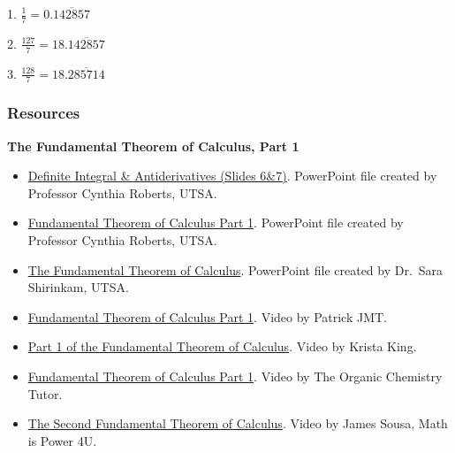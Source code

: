 1.  $\frac17=0.\overline{142857}$

2.  $\frac{127}{7}=18.\overline{142857}$

3.  $\frac{128}{7}=18.\overline{285714}$


\subsubsection{Resources}
\label{sss:reso-55b5}

\textbf{The Fundamental Theorem of Calculus, Part 1}

\begin{itemize}

\item \href{https://mathresearch.utsa.edu/wikiFiles/MAT1193/The\%20Fundamental\%20Theorem\%20of\%20Calculus/Presentation12_DefiniteIntegral\%20\&\%20Antiderivatives.pptx}{Definite Integral \& Antiderivatives (Slides 6\&7)}.  
PowerPoint file created by Professor Cynthia Roberts, UTSA.

\item \href{https://mathresearch.utsa.edu/wikiFiles/MAT1193/The\%20Fundamental\%20Theorem\%20of\%20Calculus/Presentation13_FTC\%20Part\%20I.pptx}{Fundamental Theorem of Calculus Part 1}.  
PowerPoint file created by Professor Cynthia Roberts, UTSA.

\item \href{https://mathresearch.utsa.edu/wikiFiles/MAT1214/The\%20Fundamental\%20Theorem\%20of\%20Calculus_/MAT1214-TheFundamentalTheoremPwPt.pptx}{The Fundamental Theorem of Calculus}.  
PowerPoint file created by Dr.\ Sara Shirinkam, UTSA.

\item \href{https://youtu.be/PGmVvIglZx8}{Fundamental Theorem of Calculus Part 1}.  
Video by Patrick JMT.

\item \href{https://youtu.be/yrQ6PnE6D8w}{Part 1 of the Fundamental Theorem of Calculus}.  
Video by Krista King.

\item \href{https://youtu.be/aeB5BWY0RlE}{Fundamental Theorem of Calculus Part 1}.  
Video by The Organic Chemistry Tutor.

\item \href{https://youtu.be/jyRdHbHeUuU}{The Second Fundamental Theorem of Calculus}.  
Video by James Sousa, Math is Power 4U.


\end{itemize}
